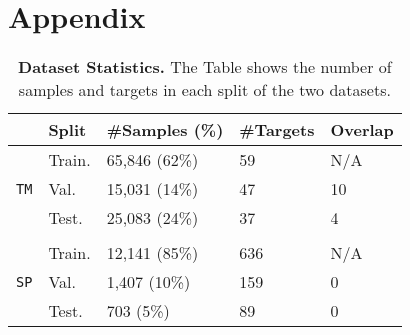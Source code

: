 \section{Appendix}

\begin{table}[h]
    \centering
    \caption{\textbf{Dataset Statistics.} The Table shows the number of samples and targets in each split of the two datasets.}
    \vspace{5pt}
    \label{tab:data}
    \begin{tabular}{lllll}
        \toprule
        & \textbf{Split} & \textbf{\#Samples} (\%) & \textbf{\#Targets} & \textbf{Overlap} \\
        \midrule
        \multirow{3}{*}{\texttt{TM}} 
        & Train. & 65,846 (62\%) & 59 & N/A \\
        & Val. & 15,031 (14\%) & 47 & 10 \\
        & Test. & 25,083 (24\%) & 37 & 4 \\
        \\
        \multirow{3}{*}{\texttt{SP}} 
        & Train. & 12,141 (85\%) & 636 & N/A \\
        & Val. & 1,407 (10\%) & 159 & 0 \\
        & Test. & 703 (5\%) & 89 & 0 \\
        \bottomrule
    \end{tabular}
\end{table}